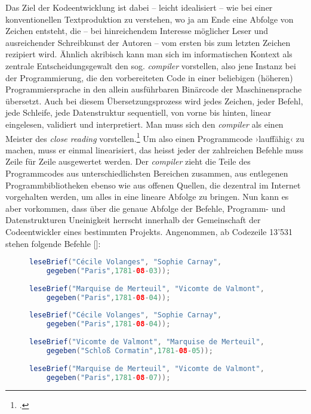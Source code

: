 \documentclass[a4paper,11pt]{article}
\newcommand{\inanf}[1]{›#1‹}
\newcommand{\anzeige}{\textbf{\color{hokkaido}\huge{\raisebox{-0.18ex}{$\bullet$}}\color{black}}}
\begin{document}
Das Ziel der Kodeentwicklung ist dabei – leicht idealisiert – wie bei einer konventionellen Textproduktion zu verstehen, wo ja am Ende eine Abfolge von Zeichen entsteht, die – bei hinreichendem Interesse möglicher Leser und ausreichender Schreibkunst der Autoren – vom ersten bis zum letzten Zeichen rezipiert wird. Ähnlich akribisch kann man sich im informatischen Kontext als zentrale Entscheidungsgewalt den sog. \emph{compiler} vorstellen, also jene Instanz bei der Programmierung, die den vorbereiteten Code in einer beliebigen (höheren) Programmiersprache in den allein ausführbaren Binärcode der Maschinensprache übersetzt. Auch bei diesem Übersetzungsprozess wird jedes Zeichen, jeder Befehl, jede Schleife, jede Datenstruktur sequentiell, von vorne bis hinten, linear eingelesen, validiert und interpretiert. Man muss sich den \emph{compiler} als einen Meister des \emph{close reading} vorstellen.\footcite[Hier wäre noch auf die kodifizierende Funktion, das Schliessen des Kodes hinzuweisen, die ja auch vom Compiler vorgenommen wird, vgl.][]{krajewski+vismann:2009} Um also einen Programmcode \inanf{lauffähig} zu machen, muss er einmal linearisiert, das heisst jeder der zahlreichen Befehle muss Zeile für Zeile ausgewertet werden. Der \emph{compiler} zieht die Teile des Programmcodes aus unterschiedlichsten Bereichen zusammen, aus entlegenen Programmbibliotheken ebenso wie aus offenen Quellen, die dezentral im Internet vorgehalten werden, um alles in eine lineare Abfolge zu bringen. Nun kann es aber vorkommen, dass über die genaue Abfolge der Befehle, Programm- und Datenstrukturen Uneinigkeit herrscht innerhalb der Gemeinschaft der Codeentwickler eines bestimmten Projekts. Angenommen, ab Codezeile 13'531 stehen folgende Befehle [\anzeige]:

\begin{figure}[ht]
\begin{lstlisting}[language=Java, firstnumber=13531]
leseBrief("Cécile Volanges", "Sophie Carnay", 
	gegeben("Paris",1781-08-03));                           // 1. Brief
	
leseBrief("Marquise de Merteuil", "Vicomte de Valmont", 
	gegeben("Paris",1781-08-04));                           // 2. Brief
	
leseBrief("Cécile Volanges", "Sophie Carnay", 
	gegeben("Paris",1781-08-04));                           // 3. Brief
	
leseBrief("Vicomte de Valmont", "Marquise de Merteuil", 
	gegeben("Schloß Cormatin",1781-08-05));                 // 4. Brief
	
leseBrief("Marquise de Merteuil", "Vicomte de Valmont", 
	gegeben("Paris",1781-08-07));                           // 5. Brief

\end{lstlisting}
\end{figure}
\end{document}
